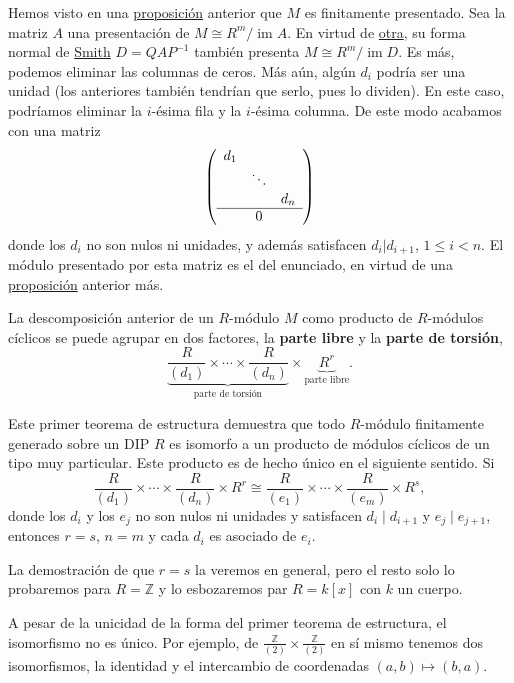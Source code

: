 
Hemos visto en una \protect\hyperlink{fgfp}{proposición} anterior que
\(M\) es finitamente presentado. Sea la matriz \(A\) una presentación de
\(M\cong R^m/\operatorname{im}A\). En virtud de
\protect\hyperlink{simplify}{otra}, su forma normal de
\protect\hyperlink{smith}{Smith} \(D=QAP^{-1}\) también presenta
\(M\cong R^m/\operatorname{im}D\). Es más, podemos eliminar las columnas
de ceros. Más aún, algún \(d_i\) podría ser una unidad (los anteriores
también tendrían que serlo, pues lo dividen). En este caso, podríamos
eliminar la \(i\)-ésima fila y la \(i\)-ésima columna. De este modo
acabamos con una matriz
\[\left( \begin{array}{ccc} d_1&&\cr &\ddots&\cr &&d_n\cr \hline &0& \end{array} \right)\]
donde los \(d_i\) no son nulos ni unidades, y además satisfacen
\(d_i|d_{i+1}\), \(1\leq i{<}n\). El módulo presentado por esta matriz
es el del enunciado, en virtud de una
\protect\hyperlink{easy}{proposición} anterior más. 

La descomposición anterior de un \(R\)-módulo \(M\) como producto de
\(R\)-módulos cíclicos se puede agrupar en dos factores, la
\textbf{parte libre} y la \textbf{parte de torsión},
\[\underbrace{\frac{R}{(d_1)}\times \cdots \times\frac{R}{(d_n)}}_{\text{parte de torsión}}\times \underbrace{R^{r}}_{\text{parte libre}}.\]


Este primer teorema de estructura demuestra que todo \(R\)-módulo
finitamente generado sobre un DIP \(R\) es isomorfo a un producto de
módulos cíclicos de un tipo muy particular. Este producto es de hecho
único en el siguiente sentido. Si \[
\frac{R}{(d_1)}\times \cdots \times\frac{R}{(d_n)}\times R^{r}
\cong  
\frac{R}{(e_1)}\times \cdots \times\frac{R}{(e_m)}\times R^{s},
\] donde los \(d_i\) y los \(e_j\) no son nulos ni unidades y
satisfacen \(d_i\mid d_{i+1}\) y \(e_j\mid e_{j+1}\), entonces
\(r=s\), \(n=m\) y cada \(d_i\) es asociado de \(e_i\).

La demostración de que \(r=s\) la veremos en general, pero el resto solo
lo probaremos para \(R=\mathbb{Z}\) y lo esbozaremos par \(R=k[x]\) con
\(k\) un cuerpo. 


A pesar de la unicidad de la forma del primer teorema de estructura, el
isomorfismo no es único. Por ejemplo, de
\(\frac{\mathbb{Z}}{(2)}\times \frac{\mathbb{Z}}{(2)}\) en sí mismo
tenemos dos isomorfismos, la identidad y el intercambio de coordenadas
\((a,b)\mapsto (b,a)\). 

